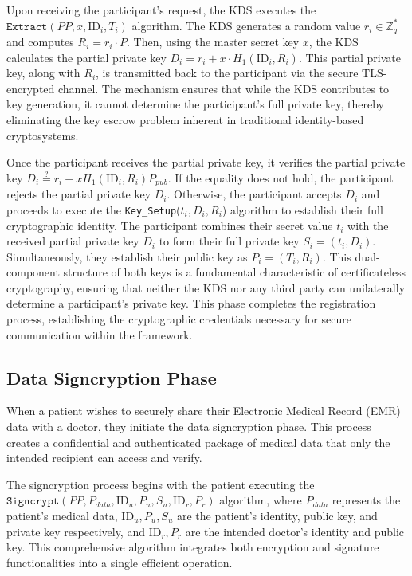 \documentclass[10pt]{article}
\begin{document}
Upon receiving the participant's request, the KDS executes the $\texttt{Extract}(PP, x, \text{ID}_i, T_i)$ algorithm. The KDS generates a random value $r_i \in \mathbb{Z}_q^*$ and computes $R_i = r_i \cdot P$. Then, using the master secret key $x$, the KDS calculates the partial private key $D_i = r_i + x \cdot H_1(\text{ID}_i, R_i)$. This partial private key, along with $R_i$, is transmitted back to the participant via the secure TLS-encrypted channel. The mechanism ensures that while the KDS contributes to key generation, it cannot determine the participant's full private key, thereby eliminating the key escrow problem inherent in traditional identity-based cryptosystems.

Once the participant receives the partial private key, it verifies the partial private key $D_i \stackrel{?}{=}r_i + xH_1(\text{ID}_i, R_i)P_{pub}$. If the equality does not hold, the participant rejects the partial private key \( D_i \). Otherwise, the participant accepts \( D_i \) and proceeds to execute the \texttt{Key\_Setup}(\(t_i, D_i, R_i\)) algorithm to establish their full cryptographic identity. The participant combines their secret value $t_i$ with the received partial private key $D_i$ to form their full private key $S_i = (t_i, D_i)$. Simultaneously, they establish their public key as $P_i = (T_i, R_i)$. This dual-component structure of both keys is a fundamental characteristic of certificateless cryptography, ensuring that neither the KDS nor any third party can unilaterally determine a participant's private key. This phase completes the registration process, establishing the cryptographic credentials necessary for secure communication within the framework.

\subsection{Data Signcryption Phase}
When a patient wishes to securely share their Electronic Medical Record (EMR) data with a doctor, they initiate the data signcryption phase. This process creates a confidential and authenticated package of medical data that only the intended recipient can access and verify.

The signcryption process begins with the patient executing the $\texttt{Signcrypt}(PP, P_{data}, \text{ID}_u, P_u, S_u, \text{ID}_r, P_r)$ algorithm, where $P_{data}$ represents the patient's medical data, $\text{ID}_u, P_u, S_u$ are the patient's identity, public key, and private key respectively, and $\text{ID}_r, P_r$ are the intended doctor's identity and public key. This comprehensive algorithm integrates both encryption and signature functionalities into a single efficient operation.
\end{document}
